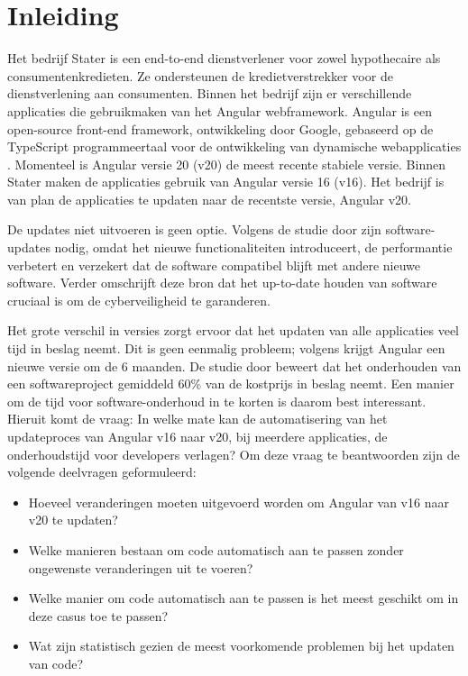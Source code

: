 
\section{Inleiding}
\label{sec:inleiding}

Het bedrijf Stater is een end-to-end dienstverlener voor zowel hypothecaire als consumentenkredieten.
Ze ondersteunen de kredietverstrekker voor de dienstverlening aan consumenten.
Binnen het bedrijf zijn er verschillende applicaties die gebruikmaken van het Angular webframework.
Angular is een open-source front-end framework, ontwikkeling door Google, gebaseerd op de TypeScript programmeertaal voor de ontwikkeling van dynamische webapplicaties \autocite{Cincovic2019}.
Momenteel is Angular versie 20 (v20) de meest recente stabiele versie.
Binnen Stater maken de applicaties gebruik van Angular versie 16 (v16).
Het bedrijf is van plan de applicaties te updaten naar de recentste versie, Angular v20.

De updates niet uitvoeren is geen optie.
Volgens de studie door \textcite{Vaniea2016} zijn software-updates nodig, omdat het nieuwe functionaliteiten introduceert, de performantie verbetert en verzekert dat de software compatibel blijft met andere nieuwe software.
Verder omschrijft deze bron dat het up-to-date houden van software cruciaal is om de cyberveiligheid te garanderen.

Het grote verschil in versies zorgt ervoor dat het updaten van alle applicaties veel tijd in beslag neemt.
Dit is geen eenmalig probleem; volgens \textcite{Callaghan2023} krijgt Angular een nieuwe versie om de 6 maanden.
De studie door \textcite{Kaur2015} beweert dat het onderhouden van een softwareproject gemiddeld 60\% van de kostprijs in beslag neemt.
Een manier om de tijd voor software-onderhoud in te korten is daarom best interessant.
Hieruit komt de vraag: In welke mate kan de automatisering van het updateproces van Angular v16 naar v20, bij meerdere applicaties, de onderhoudstijd voor developers verlagen?
Om deze vraag te beantwoorden zijn de volgende deelvragen geformuleerd:
\begin{itemize}
  \item Hoeveel veranderingen moeten uitgevoerd worden om Angular van v16 naar v20 te updaten? 
  \item Welke manieren bestaan om code automatisch aan te passen zonder ongewenste veranderingen uit te voeren? 
  \item Welke manier om code automatisch aan te passen is het meest geschikt om in deze casus toe te passen?
  \item Wat zijn statistisch gezien de meest voorkomende problemen bij het updaten van code? 
\end{itemize}

